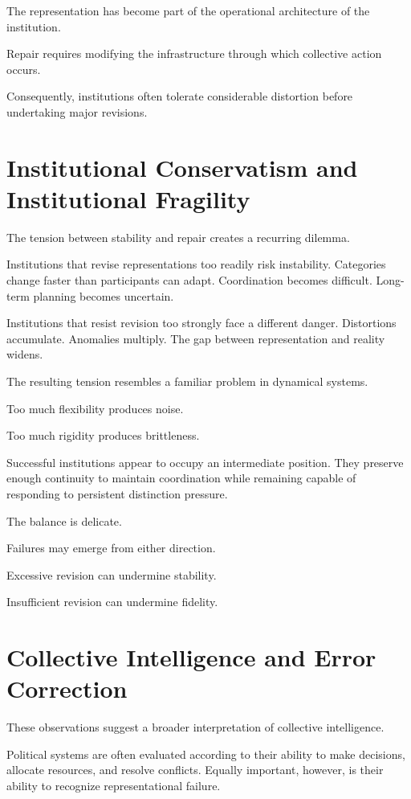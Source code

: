 \documentclass[11pt,oneside,openany]{book}
\begin{document}
The representation has become part of the operational architecture of the institution.

Repair requires modifying the infrastructure through which collective action occurs.

Consequently, institutions often tolerate considerable distortion before undertaking major revisions.

\section{Institutional Conservatism and Institutional Fragility}

The tension between stability and repair creates a recurring dilemma.

Institutions that revise representations too readily risk instability. Categories change faster than participants can adapt. Coordination becomes difficult. Long-term planning becomes uncertain.

Institutions that resist revision too strongly face a different danger. Distortions accumulate. Anomalies multiply. The gap between representation and reality widens.

The resulting tension resembles a familiar problem in dynamical systems.

Too much flexibility produces noise.

Too much rigidity produces brittleness.

Successful institutions appear to occupy an intermediate position. They preserve enough continuity to maintain coordination while remaining capable of responding to persistent distinction pressure.

The balance is delicate.

Failures may emerge from either direction.

Excessive revision can undermine stability.

Insufficient revision can undermine fidelity.

\section{Collective Intelligence and Error Correction}

These observations suggest a broader interpretation of collective intelligence.

Political systems are often evaluated according to their ability to make decisions, allocate resources, and resolve conflicts. Equally important, however, is their ability to recognize representational failure.
\end{document}
